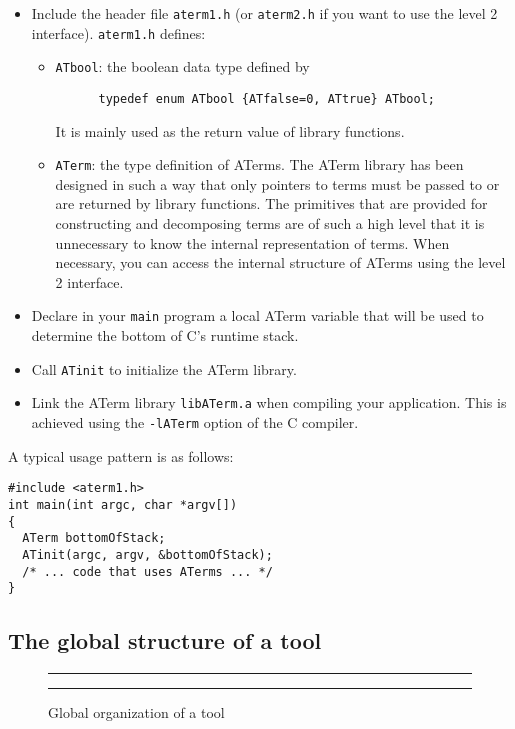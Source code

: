 \documentclass[a4,twoside,noweb]{article} %
\begin{document}
\begin{itemize}
\item Include the header file {\tt aterm1.h} (or {\tt aterm2.h} if you want to
use the level 2 interface). {\tt aterm1.h} defines:
   \begin{itemize}
   \item {\tt ATbool}: the boolean data type defined by
\begin{verbatim}
      typedef enum ATbool {ATfalse=0, ATtrue} ATbool;
\end{verbatim}
It is mainly used as the return value of library functions.

\item {\tt ATerm}: the type definition of ATerms. The ATerm library has been
  designed in such a way that only pointers to terms must be passed to or are
  returned by library functions. The primitives that are provided for
  constructing and decomposing terms are of such a high level that it is
  unnecessary to know the internal representation of terms.  When necessary,
  you can access the internal structure of ATerms using the level 2 interface.
  \end{itemize}

\item Declare in your {\tt main} program a local ATerm variable
that will be used to determine the bottom of C's runtime stack.
\item Call {\tt ATinit} to initialize the ATerm library.
\item Link the ATerm library {\tt libATerm.a} when compiling your application.
This is achieved using the {\tt -lATerm} option of the C compiler.
\end{itemize}

A typical usage pattern is as follows:

\begin{verbatim}
#include <aterm1.h>
int main(int argc, char *argv[])
{
  ATerm bottomOfStack;
  ATinit(argc, argv, &bottomOfStack);
  /* ... code that uses ATerms ... */
}
\end{verbatim}


\subsection{The global structure of a \TB tool}

\begin{figure}[tb]
\rule{\textwidth}{0.5mm}
  
  \centerline{\box\graph}
  \caption{Global organization of a tool}
  \label{fig:Tool}
\rule{\textwidth}{0.5mm}
\end{figure}
\end{document}

